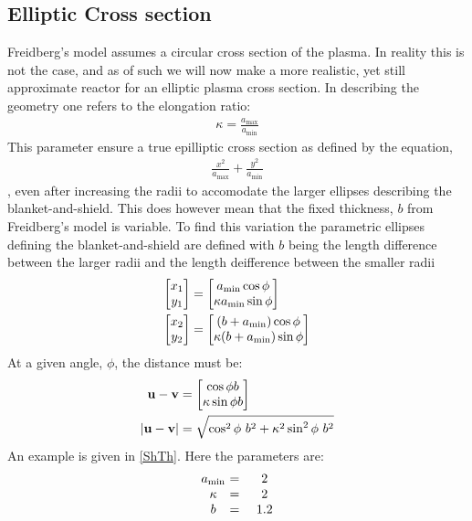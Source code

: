 \subsection{Elliptic Cross section}
Freidberg's model assumes a circular cross section of the plasma. In reality this is not the case, and as of such we will now make a more realistic, yet still approximate reactor for an elliptic plasma cross section.
In describing the geometry one refers to the elongation ratio:
\begin{align}
	\kappa = \frac{a_{\max}}{a_{\min}}
\end{align}
This parameter ensure a true epilliptic cross section as defined by the equation,
\begin{align}
	\frac{x^2}{a_{\max}}+\frac{y^2}{a_{\min}}
\end{align}
, even after increasing the radii to accomodate the larger ellipses describing the blanket-and-shield. This does however mean that the fixed thickness, \(b\) from Freidberg's model is variable. To find this variation the parametric ellipses defining the blanket-and-shield are defined with \(b\) being the length difference between the larger radii and the length deifference between the smaller radii
\begin{align}
	\mqty[x_1\\y_1] &= \mqty[a_{\min}\cos{\phi}\\\kappa a_{\min}\sin{\phi}] \\
	\mqty[x_2\\y_2] &= \mqty[\pqty{b+a_{\min}}\cos{\phi}\\\kappa \pqty{b+a_{\min}}\sin{\phi}]
\end{align}
At a given angle, \(\phi\), the distance must be:
\begin{align}
	\vb{u}-\vb{v} &= \mqty[\cos{\phi}b\\\kappa\sin{\phi}b] \\
	\abs{\vb{u}-\vb{v}} &= \sqrt{\cos^2{\phi}\ b^2+\kappa^2\sin^2{\phi}\ b^2}
\end{align}
An example is given in \cref{ShTh}. Here the parameters are:
\begin{alignat}{3}
	\mqty{a_{\min}\\\kappa\\b}&\ \mqty{=\\=\\=}\ &\mqty{2\\2\\1.2}
\end{alignat}
